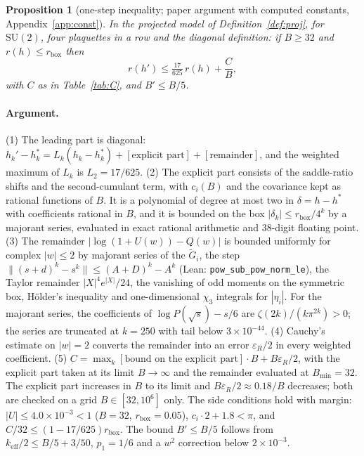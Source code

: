 \documentclass[11pt,a4paper]{article}
\newtheorem{proposition}[lemma]{Proposition}
\theoremstyle{definition}
\theoremstyle{remark}
\newcommand{\SU}{\mathrm{SU}(2)}
\newcommand{\code}[1]{\texttt{#1}}
\begin{document}
\begin{proposition}[one-step inequality; paper argument with computed constants, Appendix~\ref{app:const}]\label{prop:onestep}
In the projected model of Definition~\ref{def:proj}, for $\SU$, four plaquettes in a row and the diagonal definition: if $B\ge32$ and $r(h)\le r_{\mathrm{box}}$ then
\[
r(h')\le\tfrac{17}{625}\,r(h)+\frac{C}{B},
\]
with $C$ as in Table~\ref{tab:C}, and $B'\le B/5$.
\end{proposition}

\paragraph{Argument.}
(1) The leading part is diagonal: $h_k'-h_k^*=L_k(h_k-h_k^*)+[\text{explicit part}]+[\text{remainder}]$, and the weighted maximum of $L_k$ is $L_2=17/625$.
(2) The explicit part consists of the saddle-ratio shifts and the second-cumulant term, with $c_i(B)$ and the covariance kept as rational functions of $B$.
It is a polynomial of degree at most two in $\delta=h-h^*$ with coefficients rational in $B$, and it is bounded on the box $|\delta_k|\le r_{\mathrm{box}}/4^k$ by a majorant series, evaluated in exact rational arithmetic and 38-digit floating point.
(3) The remainder $|\log(1+U(w))-Q(w)|$ is bounded uniformly for complex $|w|\le2$ by majorant series of the $\tilde G_i$, the step $\|(s+d)^k-s^k\|\le(A+D)^k-A^k$ (Lean: \code{pow\_sub\_pow\_norm\_le}), the Taylor remainder $|X|^4e^{|X|}/24$, the vanishing of odd moments on the symmetric box, H\"older's inequality and one-dimensional $\chi_3$ integrals for $|\eta_i|$.
For the majorant series, the coefficients of $\log P(\sqrt s)-s/6$ are $\zeta(2k)/(k\pi^{2k})>0$; the series are truncated at $k=250$ with tail below $3\times10^{-44}$.
(4) Cauchy's estimate on $|w|=2$ converts the remainder into an error $\varepsilon_R/2$ in every weighted coefficient.
(5) $C=\max_k[\text{bound on the explicit part}]\cdot B+B\varepsilon_R/2$, with the explicit part taken at its limit $B\to\infty$ and the remainder evaluated at $B_{\min}=32$.
The explicit part increases in $B$ to its limit and $B\varepsilon_R/2\approx0.18/B$ decreases; both are checked on a grid $B\in[32,10^6]$ only.
The side conditions hold with margin: $|U|\le4.0\times10^{-3}<1$ ($B=32$, $r_{\mathrm{box}}=0.05$), $c_i\cdot2+1.8<\pi$, and $C/32\le(1-17/625)r_{\mathrm{box}}$.
The bound $B'\le B/5$ follows from $k_{\mathrm{eff}}/2\le B/5+3/50$, $p_1=1/6$ and a $w^2$ correction below $2\times10^{-3}$.
\end{document}
